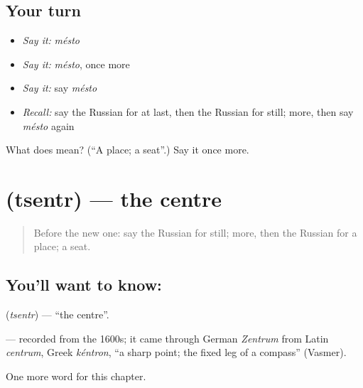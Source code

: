 \subsection*{Your turn}
\begin{itemize}
\raggedright
  \item \emph{Say it:} \emph{mésto}
  \item \emph{Say it:} \emph{mésto}, once more
  \item \emph{Say it:} say \emph{mésto}
  \item \emph{Recall:} say the Russian for at last, then the Russian for still; more, then say \emph{mésto} again
\end{itemize}

\begin{tcolorbox}[breakable,colback=teal!4,colframe=teal!35!black,title={Before you move on}]
What does  mean? (\textquotedblleft{}A place; a seat\textquotedblright{}.) Say it once more.
\end{tcolorbox}
\section[\texorpdfstring{\ru{центр} (tsentr)}{центр (tsentr)}]{ (tsentr) — the centre}

\label{lesson:RU-C151-tsentr}



\begin{quote}
Before the new one: say the Russian for still; more, then the Russian for a place; a seat.
\end{quote}

\subsection*{You'll want to know: }
\textbf{} (\emph{tsentr}) — \textquotedblleft{}the centre\textquotedblright{}.

\begin{cousinweb}
\textbf{} — recorded from the 1600s; it came through German \emph{Zentrum} from Latin \emph{centrum}, Greek \emph{kéntron}, \textquotedblleft{}a sharp point; the fixed leg of a compass\textquotedblright{} (Vasmer).
\end{cousinweb}

\begin{grammarlens}[title={What you've built}]
One more word for this chapter.
\end{grammarlens}


